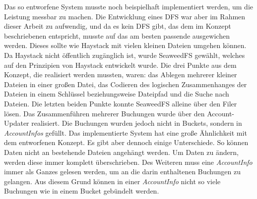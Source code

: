 \documentclass[12pt,oneside,a4paper,parskip]{scrbook}
\begin{document}
Das so entworfene System musste noch beispielhaft implementiert werden, um die Leistung messbar zu machen. Die Entwicklung eines DFS war aber im Rahmen dieser Arbeit zu aufwendig, und da es kein DFS gibt, das dem im Konzept beschriebenen entspricht, musste auf das am besten passende ausgewichen werden. Dieses sollte wie Haystack mit vielen kleinen Dateien umgehen können. Da Haystack nicht öffentlich zugänglich ist, wurde SeaweedFS gewählt, welches auf den Prinzipien von Haystack entwickelt wurde. Die drei Punkte aus dem Konzept, die realisiert werden mussten, waren: das Ablegen mehrerer kleiner Dateien in einer großen Datei, das Codieren des logischen Zusammenhanges der Dateien in einem Schlüssel beziehungsweise Dateipfad und die Suche nach Dateien. Die letzten beiden Punkte konnte SeaweedFS alleine über den Filer lösen. Das Zusammenführen mehrerer Buchungen wurde über den Account-Updater realisiert. Die Buchungen wurden jedoch nicht in Buckets, sondern in \textit{AccountInfos} gefüllt. Das implementierte System hat eine große Ähnlichkeit mit dem entworfenen Konzept. Es gibt aber dennoch einige Unterschiede. So können Daten nicht an bestehende Dateien angehängt werden. Um Daten zu ändern, werden diese immer komplett überschrieben. Des Weiteren muss eine \textit{AccountInfo} immer als Ganzes gelesen werden, um an die darin enthaltenen Buchungen zu gelangen. Aus diesem Grund können in einer \textit{AccountInfo} nicht so viele Buchungen wie in einem Bucket gebündelt werden. 
\end{document}
